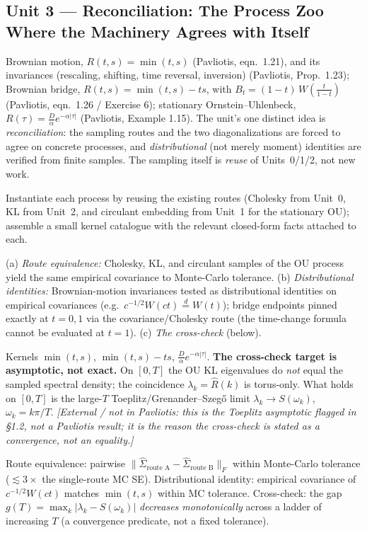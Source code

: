 \documentclass[11pt]{article}
\newcommand{\extnote}[1]{{\small\color{extgray}\emph{[External / not in Pavliotis: #1]}}}
\newcommand{\pav}[1]{{\small\color{hubblue}(Pavliotis, #1)}}
\newenvironment{unitmeta}{%
  \begin{description}[style=sameline,leftmargin=1.4cm,font=\bfseries\color{hubblue}]
}{%
  \end{description}
}
\begin{document}
\subsection*{Unit 3 --- Reconciliation: The Process Zoo Where the Machinery Agrees with Itself}
\begin{unitmeta}
\item[Concept] Brownian motion, $R(t,s)=\min(t,s)$ \pav{eqn.~1.21}, and its invariances (rescaling, shifting, time reversal, inversion) \pav{Prop.~1.23}; Brownian bridge, $R(t,s) = \min(t,s) - ts$, with $B_t = (1-t)\,W\!\left(\frac{t}{1-t}\right)$ \pav{eqn.~1.26 / Exercise 6}; stationary Ornstein--Uhlenbeck, $R(\tau) = \frac{D}{\alpha}e^{-\alpha|\tau|}$ \pav{Example 1.15}. The unit's one distinct idea is \emph{reconciliation}: the sampling routes and the two diagonalizations are forced to agree on concrete processes, and \emph{distributional} (not merely moment) identities are verified from finite samples. The sampling itself is \emph{reuse} of Units~0/1/2, not new work.
\item[Build] Instantiate each process by reusing the existing routes (Cholesky from Unit~0, KL from Unit~2, and circulant embedding from Unit~1 for the stationary OU); assemble a small kernel catalogue with the relevant closed-form facts attached to each.
\item[Check] (a) \emph{Route equivalence:} Cholesky, KL, and circulant samples of the OU process yield the same empirical covariance to Monte-Carlo tolerance. (b) \emph{Distributional identities:} Brownian-motion invariances tested as distributional identities on empirical covariances (e.g.\ $c^{-1/2}W(ct) \overset{d}{=} W(t)$); bridge endpoints pinned exactly at $t=0,1$ via the covariance/Cholesky route (the time-change formula cannot be evaluated at $t=1$). (c) \emph{The cross-check} (below).
\item[Analytic target] Kernels $\min(t,s)$, $\min(t,s)-ts$, $\tfrac{D}{\alpha}e^{-\alpha|\tau|}$. \textbf{The cross-check target is asymptotic, not exact.} On $[0,T]$ the OU KL eigenvalues do \emph{not} equal the sampled spectral density; the coincidence $\lambda_k=\hat R(k)$ is torus-only. What holds on $[0,T]$ is the large-$T$ Toeplitz/Grenander--Szeg\H{o} limit $\lambda_k \to S(\omega_k)$, $\omega_k = k\pi/T$. \extnote{this is the Toeplitz asymptotic flagged in \S1.2, not a Pavliotis result; it is the reason the cross-check is stated as a convergence, not an equality.}
\item[Pass/fail] Route equivalence: pairwise $\|\widehat\Sigma_{\text{route A}}-\widehat\Sigma_{\text{route B}}\|_F$ within Monte-Carlo tolerance ($\lesssim3\times$ the single-route MC SE). Distributional identity: empirical covariance of $c^{-1/2}W(ct)$ matches $\min(t,s)$ within MC tolerance. Cross-check: the gap $g(T)=\max_k|\lambda_k - S(\omega_k)|$ \emph{decreases monotonically} across a ladder of increasing $T$ (a convergence predicate, not a fixed tolerance).

\end{unitmeta}
\end{document}
